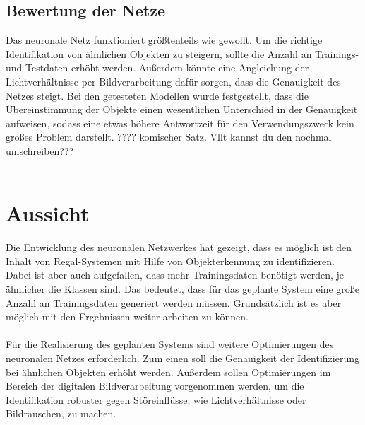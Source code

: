 \documentclass[a4paper,12pt,oneside]{article}
\begin{document}
\subsection{Bewertung der Netze}
Das neuronale Netz funktioniert größtenteils wie gewollt. Um die richtige Identifikation von ähnlichen Objekten zu steigern, sollte die Anzahl an Trainings- und Testdaten erhöht werden. Außerdem könnte eine Angleichung der Lichtverhältnisse per Bildverarbeitung dafür sorgen, dass die Genauigkeit des Netzes steigt. Bei den getesteten Modellen wurde festgestellt, dass die Übereinstimmung der Objekte einen wesentlichen Unterschied in der Genauigkeit aufweisen, sodass eine etwas höhere Antwortzeit für den Verwendungszweck kein großes Problem darstellt. ???? komischer Satz. Vllt kannst du den nochmal umschreiben???\\
\\

\newpage

\section{Aussicht}
Die Entwicklung des neuronalen Netzwerkes hat gezeigt, dass es möglich ist den Inhalt von Regal-Systemen mit Hilfe von Objekterkennung zu identifizieren. Dabei ist aber auch aufgefallen, dass mehr Trainingsdaten benötigt werden, je ähnlicher die Klassen sind. Das bedeutet, dass für das geplante System eine große Anzahl an Trainingsdaten generiert werden müssen. Grundsätzlich ist es aber möglich mit den Ergebnissen weiter arbeiten zu können.\\
\\
Für die Realisierung des geplanten Systems sind weitere Optimierungen des neuronalen Netzes erforderlich. Zum einen soll die Genauigkeit der Identifizierung bei ähnlichen Objekten erhöht werden. Außerdem sollen Optimierungen im Bereich der digitalen Bildverarbeitung vorgenommen werden, um die Identifikation robuster gegen Störeinflüsse, wie Lichtverhältnisse oder Bildrauschen, zu machen. 
\\

\newpage

\printbibliography
  
\end{document}
